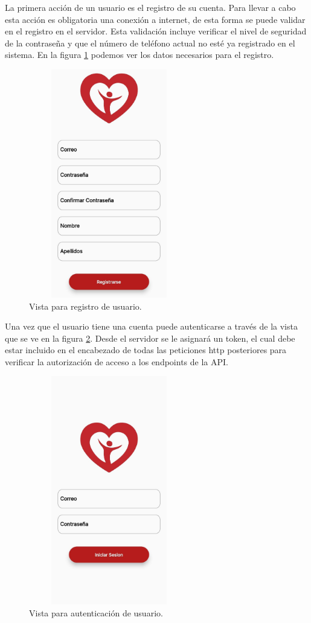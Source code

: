 La primera acción de un usuario es el registro de su cuenta. Para llevar a cabo esta acción es obligatoria una conexión a internet, de esta forma se puede validar en el registro en el servidor. Esta validación incluye verificar el nivel de seguridad de la contraseña y que el número de teléfono actual no esté ya registrado en el sistema. En la figura \ref{fig:signup_view} podemos ver los datos necesarios para el registro.
\begin{figure}[H]
	\centering
	\includegraphics[width=7cm, height=10cm]{Graphics/signup_view.jpg}
	\caption{Vista para registro de usuario.}
	\label{fig:signup_view}
\end{figure}
Una vez que el usuario tiene una cuenta puede autenticarse a través de la vista que se ve en la figura \ref{fig:auth_view}. Desde el servidor se le asignará un token, el cual debe estar incluido en el encabezado de todas las peticiones http posteriores para verificar la autorización de acceso a los endpoints de la API.
\begin{figure}[H]
	\centering
	\includegraphics[width=7cm, height=10cm]{Graphics/auth_view.jpg}
	\caption{Vista para autenticación de usuario.}
	\label{fig:auth_view}
\end{figure}

